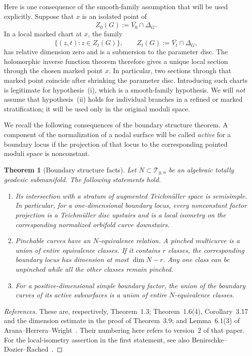 \documentclass[11pt]{article}
\newcommand{\T}{\mathcal T}
\newcommand{\ol}[1]{\overline{#1}}
\newtheorem{theorem}{Theorem}[section]
\theoremstyle{remark}
\begin{document}
Here is one consequence of the smooth-family assumption that will
be used explicitly. Suppose that \(x\) is an isolated point of
\[
Z_0(G):=\ol{V_0}\cap\Delta_G.
\]
In a local marked chart at \(x\), the family
\[
\{(z,t):z\in Z_t(G)\},\qquad
Z_t(G):=\ol{V_t}\cap\Delta_G,
\]
has relative dimension zero and is a submersion to the parameter
disc. The holomorphic inverse function theorem therefore gives
a unique local section through the chosen marked point \(x\).
In particular, two sections through that marked point coincide
after shrinking the parameter disc. Introducing such charts is
legitimate for hypothesis~(i), which is a smooth-family hypothesis.
We will \emph{not} assume that hypothesis~(ii) holds for individual
branches in a refined or marked stratification; it will be used
only in the original moduli space.

We recall the following consequences of the boundary structure
theorem. A component of the normalization of a nodal surface will
be called \emph{active} for a boundary locus if the projection of
that locus to the corresponding pointed moduli space is
nonconstant.

\begin{theorem}[Boundary structure facts]\label{thm:structure}
Let \(N\subset\T_{g,n}\) be an algebraic totally geodesic submanifold.
The following statements hold.
\begin{enumerate}
\item
Its intersection with a stratum of augmented Teichm\"uller space
is semisimple. In particular, for a one-dimensional boundary
locus, every nonconstant factor projection is a Teichm\"uller
disc upstairs and is a local isometry on the corresponding
normalized orbifold curve downstairs.

\item
Pinchable curves have an \(N\)-equivalence relation. A pinched
multicurve is a union of entire equivalence classes. If it
contains \(r\) classes, the corresponding boundary locus has
dimension at most \(\dim N-r\). Any one class can be unpinched
while all the other classes remain pinched.

\item
For a positive-dimensional simple boundary factor, the union of
the boundary curves of its active subsurfaces is a union of
entire \(N\)-equivalence classes.
\end{enumerate}
\end{theorem}

\begin{proof}[References]
These are, respectively, Theorem~1.3; Theorem~1.6(4),
Corollary~3.17 and the dimension estimate in the proof of
Theorem~3.9; and Lemma~6.1(3) of
Arana--Herrera--Wright~\cite{AHW}. Their numbering here refers
to version~2 of that paper.
For the local-isometry assertion in the first statement, see also
Benirschke--Dozier--Rached~\cite[Theorem~1.7 and
Proposition~9.2]{BDR}.
\end{proof}
\end{document}
